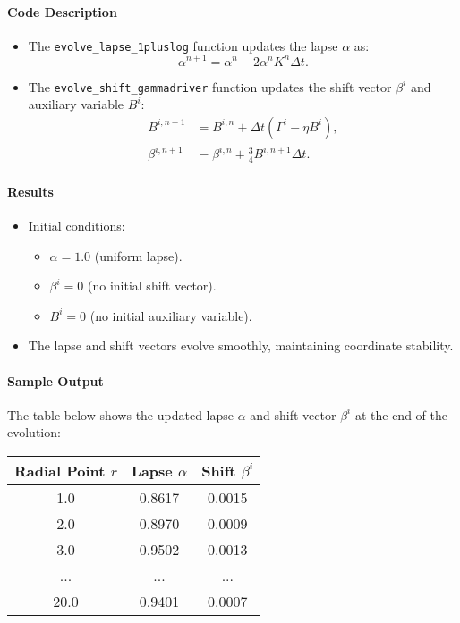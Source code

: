 \documentclass[12pt]{article}
\begin{document}
\paragraph{Code Description}
\begin{itemize}
    \item The \texttt{evolve\_lapse\_1pluslog} function updates the lapse $\alpha$ as:
    \[
    \alpha^{n+1} = \alpha^n - 2 \alpha^n K^n \Delta t.
    \]
    \item The \texttt{evolve\_shift\_gammadriver} function updates the shift vector $\beta^i$ and auxiliary variable $B^i$:
    \begin{align*}
    B^{i,n+1} &= B^{i,n} + \Delta t \left(\Gamma^i - \eta B^i\right), \\
    \beta^{i,n+1} &= \beta^{i,n} + \frac{3}{4} B^{i,n+1} \Delta t.
    \end{align*}
\end{itemize}

\paragraph{Results}
\begin{itemize}
    \item Initial conditions:
    \begin{itemize}
        \item $\alpha = 1.0$ (uniform lapse).
        \item $\beta^i = 0$ (no initial shift vector).
        \item $B^i = 0$ (no initial auxiliary variable).
    \end{itemize}
    \item The lapse and shift vectors evolve smoothly, maintaining coordinate stability.
\end{itemize}

\paragraph{Sample Output}
The table below shows the updated lapse $\alpha$ and shift vector $\beta^i$ at the end of the evolution: 

\begin{center}
\begin{tabular}{|c|c|c|}
\hline
Radial Point $r$ & Lapse $\alpha$ & Shift $\beta^i$ \\
\hline
1.0 & 0.8617 & 0.0015 \\
2.0 & 0.8970 & 0.0009 \\
3.0 & 0.9502 & 0.0013 \\
... & ... & ... \\
20.0 & 0.9401 & 0.0007 \\
\hline
\end{tabular}
\end{center}
\end{document}
